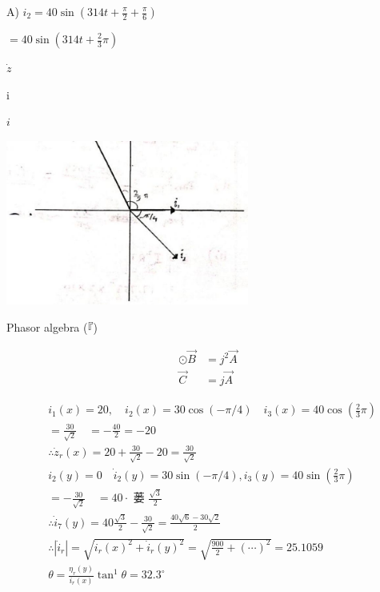 \documentclass[12pt, a4paper]{article}
\newcommand{\figwidth}{8cm}
\begin{document}
	A) $i_{2}=40 \sin \left(314 t+\frac{\pi}{2}+\frac{\pi}{6}\right)$

$=40 \sin \left(314 t+\frac{2}{3} \pi\right)$

$\dot{z}$

	i

$i$

	\begin{center}
		\includegraphics[max width=\figwidth]{2024_06_15_74bbabba7981675b0d49g-03(2)}
	\end{center}

	Phasor algebra (『)

	$$
		\begin{aligned}
			\odot \vec{B} & =j^{2} \vec{A} \\
			\vec{C}       & =j \vec{A}
		\end{aligned}
	$$

	$$
		\begin{aligned}
			 & i_{1}(x)=20, \quad i_{2}(x)=30 \cos (-\pi / 4) \quad i_{3}(x)=40 \cos \left(\frac{2}{3} \pi\right)                        \\
			 & =\frac{30}{\sqrt{2}} \quad=-\frac{40}{2}=-20                                                                              \\
			 & \therefore \dot{z}_{r}(x)=20+\frac{30}{\sqrt{2}}-20=\frac{30}{\sqrt{2}}                                                   \\
			 & i_{2}(y)=0 \quad \dot{i}_{2}(y)=30 \sin (-\pi / 4), i_{3}(y)=40 \sin \left(\frac{2}{3} \pi\right)                         \\
			 & =-\frac{30}{\sqrt{2}} \quad=40 \cdot \text { 蒌 } \frac{\sqrt{3}}{2}                                                       \\
			 & \therefore \dot{i}_{7}(y)=40 \frac{\sqrt{3}}{2}-\frac{30}{\sqrt{2}}=\frac{40 \sqrt{6}-30 \sqrt{2}}{2}                     \\
			 & \therefore\left|\dot{i}_{r}\right|=\sqrt{\dot{i}_{r}(x)^{2}+\dot{i}_{r}(y)^{2}}=\sqrt{\frac{900}{2}+(\cdots)^{2}}=25.1059 \\
			 & \theta=\frac{\eta_{r}(y)}{i_{r}(x)} \tan ^{1} \theta=32.3^{\circ}
		\end{aligned}
	$$
\end{document}
